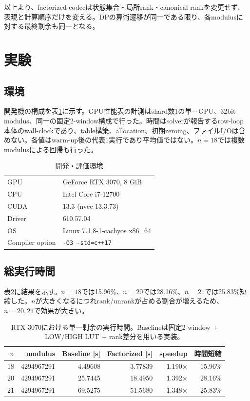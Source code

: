\documentclass[a4paper,10pt,twocolumn]{ltjsarticle}
\newcommand{\code}[1]{\texttt{#1}}
\begin{document}
以上より、factorized codecは状態集合・局所rank・canonical rankを変更せず、表現と計算順序だけを変える。DPの算術遷移が同一である限り、各modulusに対する最終剰余も同一となる。

\section{実験}
\subsection{環境}
開発機の構成を表\ref{tab:env}に示す。GPU性能表の計測はshard数1の単一GPU、32bit modulus、同一の固定2-window構成で行った。時間はsolverが報告するrow-loop本体のwall-clockであり、table構築、allocation、初期zeroing、ファイルI/Oは含めない。各値はwarm-up後の代表1実行であり平均値ではない。$n=18$では複数modulusによる回帰も行った。

\begin{table}[t]
\centering
\caption{開発・評価環境}
\label{tab:env}
\begin{tabular}{ll}
\toprule
GPU & GeForce RTX 3070, 8 GiB\\
CPU & Intel Core i7-12700\\
CUDA & 13.3 (nvcc 13.3.73)\\
Driver & 610.57.04\\
OS & Linux 7.1.8-1-cachyos x86\_64\\
Compiler option & \code{-O3 -std=c++17}\\
\bottomrule
\end{tabular}
\end{table}

\subsection{総実行時間}
表\ref{tab:perf}に結果を示す。$n=18$では15.96\%、$n=20$では28.16\%、$n=21$では25.83\%短縮した。$n$が大きくなるにつれrank/unrankが占める割合が増えるため、$n=20,21$で効果が大きい。

\begin{table}[t]
\centering
\caption{RTX 3070における単一剰余の実行時間。Baselineは固定2-window + LOW/HIGH LUT + rank差分を用いる実装。}
\label{tab:perf}
\begin{tabular}{rrrrrr}
\toprule
$n$ & modulus & Baseline [s] & Factorized [s] & speedup & 時間短縮\\
\midrule
18 & 4294967291 & 4.49608 & 3.77839 & 1.190$\times$ & 15.96\%\\
20 & 4294967291 & 25.7445 & 18.4950 & 1.392$\times$ & 28.16\%\\
21 & 4294967291 & 69.5275 & 51.5680 & 1.348$\times$ & 25.83\%\\
\bottomrule
\end{tabular}
\end{table}
\end{document}
